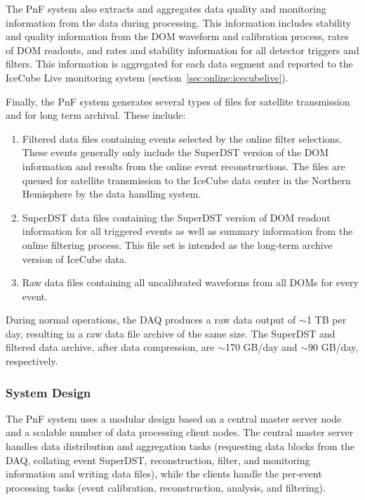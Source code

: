 The PnF system also extracts and aggregates data quality and monitoring
information from the data during processing.  This information includes
stability and quality information from the DOM waveform and calibration
process, rates of DOM readouts, and rates and 
stability information for all detector triggers and filters.  This
information is aggregated for each data segment and reported to the IceCube
Live monitoring system (section~\ref{sec:online:icecubelive}).

Finally, the PnF system generates several types of files for satellite
transmission and for long term archival. These
include:   
\begin{enumerate}
\item Filtered data files containing events selected by the online filter
  selections.  These events generally only include the SuperDST version of
  the DOM information and results from the online event reconstructions.
  The files are queued for satellite transmission to the IceCube data
  center in the Northern Hemisphere by the data handling system.
\item SuperDST data files containing the SuperDST version of DOM readout
  information for all triggered events as well as summary information from
  the online filtering process.  This file set is intended as the long-term
  archive version of IceCube data.
\item Raw data files containing all uncalibrated waveforms from all DOMs for
  every event.  
\end{enumerate}

During normal operations, the DAQ produces a raw data output of
$\sim$1 TB per day, resulting in a raw data file 
archive of the same size.  The SuperDST and filtered data archive, after
data compression, are $\sim$170 GB/day and $\sim$90 GB/day, respectively.

\subsubsection{System Design}

The PnF system uses a modular design based on
a central master server node and a scalable number of data processing client
nodes.  The central master server handles data distribution and
aggregation tasks (requesting data blocks from the DAQ, collating event
SuperDST, reconstruction, filter, and monitoring information and writing
data files), while the clients handle the per-event processing
tasks (event calibration, reconstruction, analysis, and filtering).


